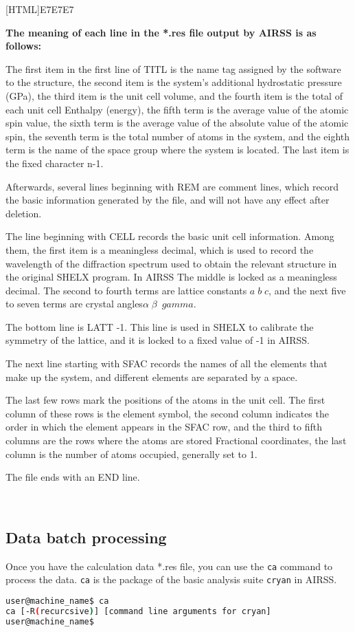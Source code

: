 \documentclass[a4paper, 10pt]{article}
\begin{document}
\noindent{}[HTML]{E7E7E7}{\parbox{\textwidth}{%
\noindent \textbf{The meaning of each line in the *.res file output by AIRSS is as follows:}
\begin{maineu}
\item The first item in the first line of TITL is the name tag assigned by the software to the structure, the second item is the system's additional hydrostatic pressure (GPa), the third item is the unit cell volume, and the fourth item is the total of each unit cell Enthalpy (energy), the fifth term is the average value of the atomic spin value, the sixth term is the average value of the absolute value of the atomic spin, the seventh term is the total number of atoms in the system, and the eighth term is the name of the space group where the system is located. The last item is the fixed character n-1.
\item Afterwards, several lines beginning with REM are comment lines, which record the basic information generated by the file, and will not have any effect after deletion.
\item The line beginning with CELL records the basic unit cell information. Among them, the first item is a meaningless decimal, which is used to record the wavelength of the diffraction spectrum used to obtain the relevant structure in the original SHELX program. In AIRSS The middle is locked as a meaningless decimal. The second to fourth terms are lattice constants \(a\;b\;c\), and the next five to seven terms are crystal angles\(\alpha\;\beta\;\ gamma\).
\item The bottom line is LATT -1. This line is used in SHELX to calibrate the symmetry of the lattice, and it is locked to a fixed value of -1 in AIRSS.
\item The next line starting with SFAC records the names of all the elements that make up the system, and different elements are separated by a space.
\item The last few rows mark the positions of the atoms in the unit cell. The first column of these rows is the element symbol, the second column indicates the order in which the element appears in the SFAC row, and the third to fifth columns are the rows where the atoms are stored Fractional coordinates, the last column is the number of atoms occupied, generally set to 1.
\item The file ends with an END line.
\end{maineu}}}\\

\subsection{Data batch processing}
Once you have the calculation data *.res file, you can use the \verb|ca| command to process the data. \verb|ca| is the package of the basic analysis suite \verb|cryan| in AIRSS.
\begin{lstlisting}[language={bash}]
user@machine_name$ ca
ca [-R(recurcsive)] [command line arguments for cryan]
user@machine_name$
\end{lstlisting}
\end{document}
